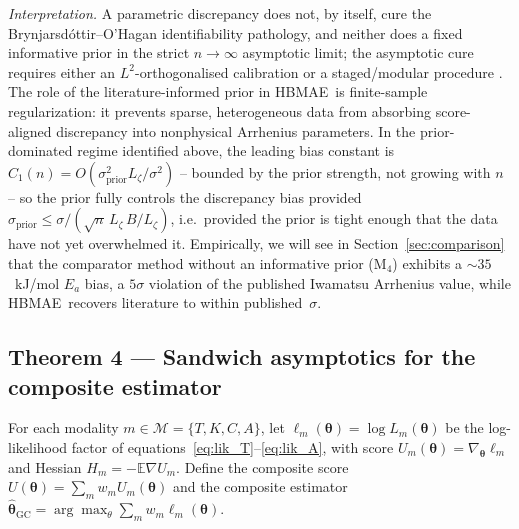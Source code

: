 \documentclass[12pt]{article}
\theoremstyle{plain}
\theoremstyle{definition}
\theoremstyle{remark}
\newcommand{\HBMAE}{HBMAE\xspace}
\newcommand{\E}{\mathbb{E}}
\begin{document}
\emph{Interpretation.}  A parametric discrepancy does not, by itself,
cure the Brynjarsd\'ottir--O'Hagan identifiability pathology, and neither
does a fixed informative prior in the strict $n\to\infty$ asymptotic
limit; the asymptotic cure requires either an $L^2$-orthogonalised
calibration \citep{TuoWu2015,TuoWu2016} or a staged/modular procedure
\citep{Vollmer2009,Plumlee2017}.  The role of the literature-informed
prior in \HBMAE\ is finite-sample regularization: it prevents sparse,
heterogeneous data from absorbing score-aligned discrepancy into
nonphysical Arrhenius parameters.  In the prior-dominated regime
identified above, the leading bias constant is
$C_1(n) = O(\sigma_{\mathrm{prior}}^2 L_\zeta / \sigma^2)$ -- bounded
by the prior strength, not growing with $n$ -- so the prior fully controls
the discrepancy bias provided $\sigma_{\mathrm{prior}}\le\sigma/(\sqrt{n}\,
L_\zeta\,B/L_\zeta)$, i.e.\ provided the prior is tight enough that the
data have not yet overwhelmed it.  Empirically, we will see in
Section~\ref{sec:comparison} that the comparator method without an
informative prior (M$_4$) exhibits a $\sim 35$~kJ/mol $E_a$ bias, a
$5\sigma$ violation of the published Iwamatsu Arrhenius value, while
\HBMAE\ recovers literature to within published~$\sigma$.

\subsection{Theorem 4 --- Sandwich asymptotics for the composite estimator}\label{sec:thm4}

For each modality $m\in\mathcal{M}=\{T,K,C,A\}$, let
$\ell_m(\boldsymbol\theta)=\log L_m(\boldsymbol\theta)$ be the
log-likelihood factor of
equations~\eqref{eq:lik_T}--\eqref{eq:lik_A}, with score
$U_m(\boldsymbol\theta)=\nabla_{\boldsymbol\theta}\ell_m$ and Hessian
$H_m=-\E\nabla U_m$.  Define the composite score
$U(\boldsymbol\theta)=\sum_m w_m U_m(\boldsymbol\theta)$ and the
composite estimator $\hat{\boldsymbol\theta}_{\mathrm{GC}}=
\arg\max_\theta\sum_m w_m\ell_m(\boldsymbol\theta)$.
\end{document}
